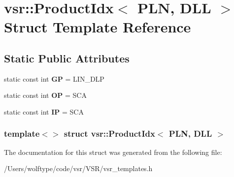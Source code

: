\hypertarget{structvsr_1_1_product_idx_3_01_p_l_n_00_01_d_l_l_01_4}{\section{vsr\-:\-:Product\-Idx$<$ P\-L\-N, D\-L\-L $>$ Struct Template Reference}
\label{structvsr_1_1_product_idx_3_01_p_l_n_00_01_d_l_l_01_4}
}
\subsection*{Static Public Attributes}
\begin{DoxyCompactItemize}
\item 
\hypertarget{structvsr_1_1_product_idx_3_01_p_l_n_00_01_d_l_l_01_4_aa2cfa8ce6ec0ad665a8814af8ba7f509}{static const int {\bfseries G\-P} = L\-I\-N\-\_\-\-D\-L\-P}\label{structvsr_1_1_product_idx_3_01_p_l_n_00_01_d_l_l_01_4_aa2cfa8ce6ec0ad665a8814af8ba7f509}

\item 
\hypertarget{structvsr_1_1_product_idx_3_01_p_l_n_00_01_d_l_l_01_4_a96292cd4ae125f86bcaee967c408c7c6}{static const int {\bfseries O\-P} = S\-C\-A}\label{structvsr_1_1_product_idx_3_01_p_l_n_00_01_d_l_l_01_4_a96292cd4ae125f86bcaee967c408c7c6}

\item 
\hypertarget{structvsr_1_1_product_idx_3_01_p_l_n_00_01_d_l_l_01_4_a244db4ca96204e67d678ef325ac1f5b2}{static const int {\bfseries I\-P} = S\-C\-A}\label{structvsr_1_1_product_idx_3_01_p_l_n_00_01_d_l_l_01_4_a244db4ca96204e67d678ef325ac1f5b2}

\end{DoxyCompactItemize}
\subsubsection*{template$<$$>$ struct vsr\-::\-Product\-Idx$<$ P\-L\-N, D\-L\-L $>$}



The documentation for this struct was generated from the following file\-:\begin{DoxyCompactItemize}
\item 
/\-Users/wolftype/code/vsr/\-V\-S\-R/vsr\-\_\-templates.\-h\end{DoxyCompactItemize}
